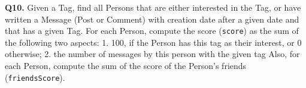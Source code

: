 \textbf{Q10.}
Given a Tag, find all Persons that are either interested in the Tag, or
have written a Message (Post or Comment) with creation date after a
given date and that has a given Tag. For each Person, compute the score
(\texttt{score}) as the sum of the following two aspects: 1. 100, if the Person has this tag as their interest, or 0 otherwise; 2. the number of messages by this person with the given tag
Also, for each Person, compute the sum of the score of the Person's
friends (\texttt{friendsScore}).

